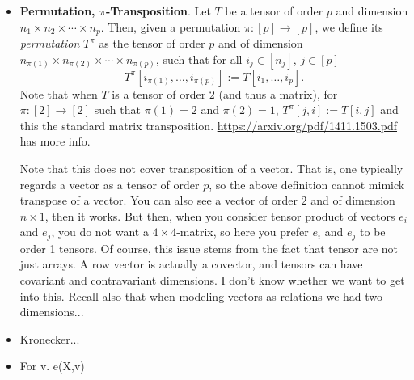 \begin{itemize}
\item \textbf{Permutation, $\pi$-Transposition}. Let $T$ be a tensor of order $p$ and dimension $n_1\times n_2\times\cdots\times n_p$. Then, given a permutation 
$\pi:[p]\to [p]$, we define its \textit{permutation} $T^\pi$ as the tensor of order $p$ and of dimension
$n_{\pi(1)}\times n_{\pi(2)}\times\cdots\times n_{\pi(p)}$, such that for all $i_j\in[n_j]$, $j\in[p]$
$$
T^{\pi}[i_{\pi(1)},\ldots,i_{\pi(p)}]:=T[i_1,\ldots,i_p].
$$
Note that when $T$ is a tensor of order $2$ (and thus a matrix), for $\pi:[2]\to[2]$ such that $\pi(1)=2$ and $\pi(2)=1$,
$T^\pi[j,i]:=T[i,j]$ and this the standard matrix transposition. \url{https://arxiv.org/pdf/1411.1503.pdf} has more info.

Note that this does not cover transposition of a vector. That is, one typically regards a vector as a tensor of order $p$, so the above definition cannot mimick transpose of a vector. You can also see a vector of order $2$ and of dimension $n\times 1$, then it works. But then, when you consider tensor product of vectors $e_i$ and $e_j$, you do not want a $4\times 4$-matrix, so here you prefer $e_i$ and $e_j$ to be order 1 tensors.
Of course, this issue stems from the fact that tensor are not just arrays. A row vector is actually a covector, and tensors can have covariant and contravariant dimensions. I don't know whether we want to get into this. Recall also that when modeling vectors as relations we had two dimensions...


\item Kronecker...

\item For v. e(X,v)
 \end{itemize}


